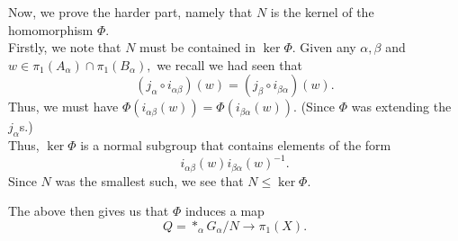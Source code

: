 \documentclass[12pt]{article}
\theoremstyle{definition}
\numberwithin{thm}{section}
\begin{document}
	Now, we prove the harder part, namely that $N$ is the kernel of the homomorphism $\Phi.$\\
	Firstly, we note that $N$ must be contained in $\ker \Phi.$ Given any $\alpha, \beta$ and $w \in \pi_1(A_\alpha)\cap\pi_1(B_\alpha),$ we recall we had seen that
	\begin{equation*} 
		(j_{\alpha}\circ i_{\alpha\beta})(w) = (j_{\beta}\circ i_{\beta\alpha})(w).
	\end{equation*}
	Thus, we must have $\Phi(i_{\alpha\beta}(w)) = \Phi(i_{\beta\alpha}(w)).$ (Since $\Phi$ was extending the $j_\alpha$s.)\\
	Thus, $\ker\Phi$ is a normal subgroup that contains elements of the form
	\begin{equation*} 
		i_{\alpha\beta}(w)i_{\beta\alpha}(w)^{-1}.
	\end{equation*}
	Since $N$ was the smallest such, we see that $N \le \ker\Phi.$

	The above then gives us that $\Phi$ induces a map
	\begin{equation*} 
		Q = *_\alpha G_\alpha/N \to \pi_1(X).
	\end{equation*}
\end{document}
